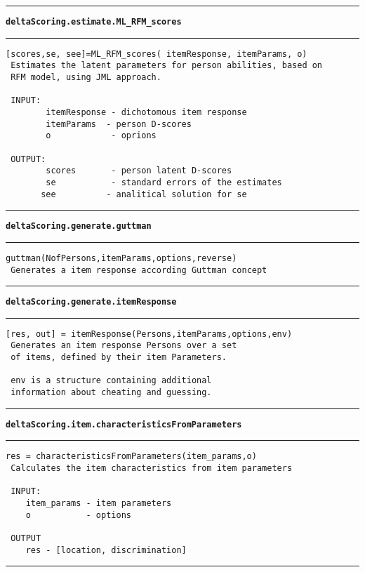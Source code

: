 \par\noindent\rule{\textwidth}{0.4pt}
{\bf\tt deltaScoring.estimate.ML\_RFM\_scores}
\par\noindent\rule{\textwidth}{0.4pt}
\begin{lstlisting}[style=Matlab-bw]
 [scores,se, see]=ML_RFM_scores( itemResponse, itemParams, o)
 Estimates the latent parameters for person abilities, based on
 RFM model, using JML approach.

 INPUT: 
		itemResponse - dichotomous item response
		itemParams  - person D-scores	
		o            - oprions 

 OUTPUT:
		scores       - person latent D-scores
		se           - standard errors of the estimates
       see          - analitical solution for se  
\end{lstlisting}
\par\noindent\rule{\textwidth}{0.4pt}
{\bf\tt deltaScoring.generate.guttman}
\par\noindent\rule{\textwidth}{0.4pt}
\begin{lstlisting}[style=Matlab-bw]
 guttman(NofPersons,itemParams,options,reverse)
 Generates a item response according Guttman concept
\end{lstlisting}
\par\noindent\rule{\textwidth}{0.4pt}
{\bf\tt deltaScoring.generate.itemResponse}
\par\noindent\rule{\textwidth}{0.4pt}
\begin{lstlisting}[style=Matlab-bw]
 [res, out] = itemResponse(Persons,itemParams,options,env)
 Generates an item response Persons over a set
 of items, defined by their item Parameters.

 env is a structure containing additional
 information about cheating and guessing.
\end{lstlisting}
\par\noindent\rule{\textwidth}{0.4pt}
{\bf\tt deltaScoring.item.characteristicsFromParameters}
\par\noindent\rule{\textwidth}{0.4pt}
\begin{lstlisting}[style=Matlab-bw]
 res = characteristicsFromParameters(item_params,o)
 Calculates the item characteristics from item parameters

 INPUT: 
	item_params - item parameters
	o           - options

 OUTPUT
	res - [location, discrimination]	
\end{lstlisting}
\par\noindent\rule{\textwidth}{0.4pt}
